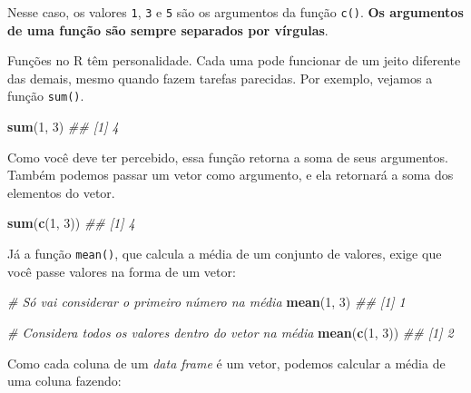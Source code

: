 \documentclass[]{book}
\newenvironment{Shaded}{\begin{snugshade}}{\end{snugshade}}
\newcommand{\CommentTok}[1]{\textcolor[rgb]{0.56,0.35,0.01}{\textit{#1}}}
\newcommand{\DecValTok}[1]{\textcolor[rgb]{0.00,0.00,0.81}{#1}}
\newcommand{\KeywordTok}[1]{\textcolor[rgb]{0.13,0.29,0.53}{\textbf{#1}}}
\newcommand{\NormalTok}[1]{#1}
\newcommand{\OperatorTok}[1]{\textcolor[rgb]{0.81,0.36,0.00}{\textbf{#1}}}
\begin{document}
Nesse caso, os valores \texttt{1}, \texttt{3} e \texttt{5} são os argumentos da função \texttt{c()}. \textbf{Os argumentos de uma função são sempre separados por vírgulas}.

Funções no R têm personalidade. Cada uma pode funcionar de um jeito diferente das demais, mesmo quando fazem tarefas parecidas. Por exemplo, vejamos a função \texttt{sum()}.

\begin{Shaded}
\begin{Highlighting}[]
\KeywordTok{sum}\NormalTok{(}\DecValTok{1}\NormalTok{, }\DecValTok{3}\NormalTok{)}
\CommentTok{## [1] 4}
\end{Highlighting}
\end{Shaded}

Como você deve ter percebido, essa função retorna a soma de seus argumentos. Também podemos passar um vetor como argumento, e ela retornará a soma dos elementos do vetor.

\begin{Shaded}
\begin{Highlighting}[]
\KeywordTok{sum}\NormalTok{(}\KeywordTok{c}\NormalTok{(}\DecValTok{1}\NormalTok{, }\DecValTok{3}\NormalTok{))}
\CommentTok{## [1] 4}
\end{Highlighting}
\end{Shaded}

Já a função \texttt{mean()}, que calcula a média de um conjunto de valores, exige que você passe valores na forma de um vetor:

\begin{Shaded}
\begin{Highlighting}[]
\CommentTok{# Só vai considerar o primeiro número na média}
\KeywordTok{mean}\NormalTok{(}\DecValTok{1}\NormalTok{, }\DecValTok{3}\NormalTok{)}
\CommentTok{## [1] 1}

\CommentTok{# Considera todos os valores dentro do vetor na média}
\KeywordTok{mean}\NormalTok{(}\KeywordTok{c}\NormalTok{(}\DecValTok{1}\NormalTok{, }\DecValTok{3}\NormalTok{))}
\CommentTok{## [1] 2}
\end{Highlighting}
\end{Shaded}

Como cada coluna de um \emph{data frame} é um vetor, podemos calcular a média de uma coluna fazendo:

\begin{Shaded}
\end{Shaded}
\end{document}
